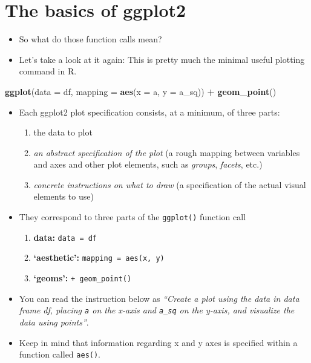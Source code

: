 \documentclass[
]{book}
\newenvironment{Shaded}{\begin{snugshade}}{\end{snugshade}}
\newcommand{\AttributeTok}[1]{\textcolor[rgb]{0.13,0.29,0.53}{#1}}
\newcommand{\FunctionTok}[1]{\textcolor[rgb]{0.13,0.29,0.53}{\textbf{#1}}}
\newcommand{\NormalTok}[1]{#1}
\newcommand{\SpecialCharTok}[1]{\textcolor[rgb]{0.81,0.36,0.00}{\textbf{#1}}}
\providecommand{\tightlist}{%
  \setlength{\itemsep}{0pt}\setlength{\parskip}{0pt}}
\begin{document}
\section{The basics of ggplot2}\label{the-basics-of-ggplot2-1}

\begin{itemize}
\item
  So what do those function calls mean?
\item
  Let's take a look at it again: This is pretty much the minimal useful plotting command in R.
\end{itemize}

\begin{Shaded}
\begin{Highlighting}[]
\FunctionTok{ggplot}\NormalTok{(}\AttributeTok{data =}\NormalTok{ df, }\AttributeTok{mapping =} \FunctionTok{aes}\NormalTok{(}\AttributeTok{x =}\NormalTok{ a, }\AttributeTok{y =}\NormalTok{ a\_sq)) }\SpecialCharTok{+} \FunctionTok{geom\_point}\NormalTok{()}
\end{Highlighting}
\end{Shaded}

\begin{itemize}
\tightlist
\item
  Each ggplot2 plot specification consists, at a minimum, of three parts:

  \begin{enumerate}
  \def\labelenumi{\arabic{enumi}.}
  \tightlist
  \item
    {the data to plot}
  \item
    {\emph{an abstract specification of the plot} (a rough mapping between variables and axes and other plot elements, such as \emph{groups}, \emph{facets}, etc.)}
  \item
    {\emph{concrete instructions on what to draw} (a specification of the actual visual elements to use)}
  \end{enumerate}
\item
  They correspond to three parts of the \texttt{ggplot()} function call

  \begin{enumerate}
  \def\labelenumi{\arabic{enumi}.}
  \tightlist
  \item
    {\textbf{data:} \texttt{data\ =\ df}}
  \item
    {\textbf{`aesthetic':} \texttt{mapping\ =\ aes(x,\ y)}}
  \item
    {\textbf{`geoms':} \texttt{+\ geom\_point()}}
  \end{enumerate}
\item
  You can read the instruction below as \emph{``Create a plot {using the data in data frame df}, {placing \texttt{a} on the x-axis and \texttt{a\_sq} on the y-axis}, {and visualize the data using points}''}.
\item
  Keep in mind that information regarding x and y axes is specified within a function called \texttt{aes()}.
\end{itemize}
\end{document}
